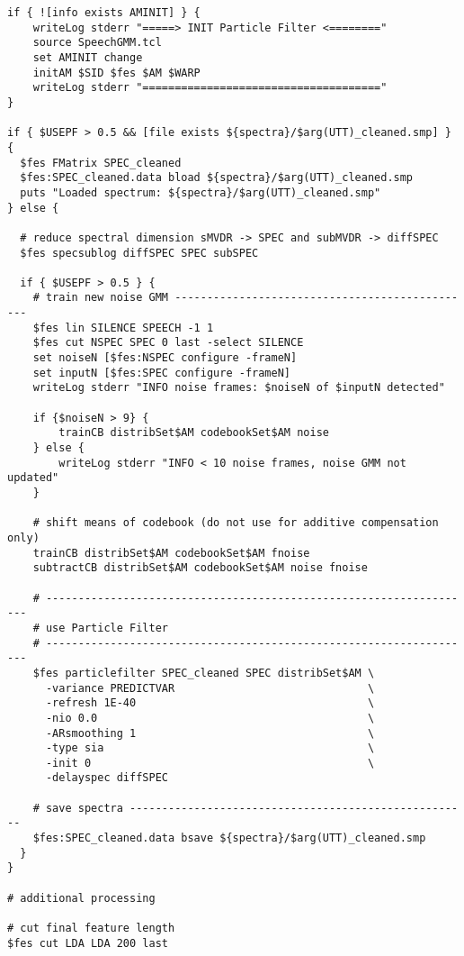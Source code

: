 \begin{verbatim}
if { ![info exists AMINIT] } {
    writeLog stderr "=====> INIT Particle Filter <========"
    source SpeechGMM.tcl
    set AMINIT change   
    initAM $SID $fes $AM $WARP
    writeLog stderr "====================================="
}
 
if { $USEPF > 0.5 && [file exists ${spectra}/$arg(UTT)_cleaned.smp] } {
  $fes FMatrix SPEC_cleaned
  $fes:SPEC_cleaned.data bload ${spectra}/$arg(UTT)_cleaned.smp
  puts "Loaded spectrum: ${spectra}/$arg(UTT)_cleaned.smp"
} else {

  # reduce spectral dimension sMVDR -> SPEC and subMVDR -> diffSPEC
  $fes specsublog diffSPEC SPEC subSPEC
  
  if { $USEPF > 0.5 } {
    # train new noise GMM -----------------------------------------------
    $fes lin SILENCE SPEECH -1 1
    $fes cut NSPEC SPEC 0 last -select SILENCE
    set noiseN [$fes:NSPEC configure -frameN]
    set inputN [$fes:SPEC configure -frameN]
    writeLog stderr "INFO noise frames: $noiseN of $inputN detected"

    if {$noiseN > 9} {
        trainCB distribSet$AM codebookSet$AM noise
    } else {
        writeLog stderr "INFO < 10 noise frames, noise GMM not updated"
    }

    # shift means of codebook (do not use for additive compensation only)
    trainCB distribSet$AM codebookSet$AM fnoise
    subtractCB distribSet$AM codebookSet$AM noise fnoise

    # -------------------------------------------------------------------
    # use Particle Filter
    # -------------------------------------------------------------------
    $fes particlefilter SPEC_cleaned SPEC distribSet$AM \
      -variance PREDICTVAR                              \
      -refresh 1E-40                                    \
      -nio 0.0                                          \
      -ARsmoothing 1                                    \
      -type sia                                         \
      -init 0                                           \
      -delayspec diffSPEC

    # save spectra -----------------------------------------------------
    $fes:SPEC_cleaned.data bsave ${spectra}/$arg(UTT)_cleaned.smp
  }
} 

# additional processing

# cut final feature length
$fes cut LDA LDA 200 last 
\end{verbatim}


